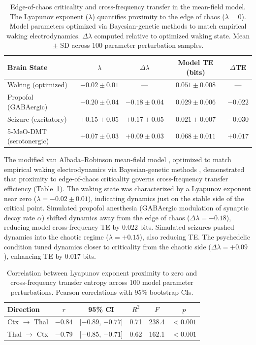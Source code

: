 \documentclass[11pt]{article}
\begin{document}
\begin{table}[H]
\centering
\caption{Edge-of-chaos criticality and cross-frequency transfer in the mean-field model. The Lyapunov exponent ($\lambda$) quantifies proximity to the edge of chaos ($\lambda = 0$). Model parameters optimized via Bayesian-genetic methods to match empirical waking electrodynamics. $\Delta\lambda$ computed relative to optimized waking state. Mean $\pm$ SD across 100 parameter perturbation samples.}
\label{tab:model}
\begin{tabular}{lcccc}
\toprule
Brain State & $\lambda$ & $\Delta\lambda$ & Model TE (bits) & $\Delta$TE \\
\midrule
Waking (optimized) & $-0.02 \pm 0.01$ & --- & $0.051 \pm 0.008$ & --- \\
Propofol (GABAergic) & $-0.20 \pm 0.04$ & $-0.18 \pm 0.04$ & $0.029 \pm 0.006$ & $-0.022$ \\
Seizure (excitatory) & $+0.15 \pm 0.05$ & $+0.17 \pm 0.05$ & $0.021 \pm 0.007$ & $-0.030$ \\
5-MeO-DMT (serotonergic) & $+0.07 \pm 0.03$ & $+0.09 \pm 0.03$ & $0.068 \pm 0.011$ & $+0.017$ \\
\bottomrule
\end{tabular}
\end{table}

The modified van Albada--Robinson mean-field model \citep{vanalbada2009mean}, optimized to match empirical waking electrodynamics via Bayesian-genetic methods \citep{sherif2020bayesian}, demonstrated that proximity to edge-of-chaos criticality governs cross-frequency transfer efficiency (Table~\ref{tab:model}). The waking state was characterized by a Lyapunov exponent near zero ($\lambda = -0.02 \pm 0.01$), indicating dynamics just on the stable side of the critical point. Simulated propofol anesthesia (GABAergic modulation of synaptic decay rate $\alpha$) shifted dynamics away from the edge of chaos ($\Delta\lambda = -0.18$), reducing model cross-frequency TE by 0.022 bits. Simulated seizures pushed dynamics into the chaotic regime ($\lambda = +0.15$), also reducing TE. The psychedelic condition tuned dynamics closer to criticality from the chaotic side ($\Delta\lambda = +0.09$), enhancing TE by 0.017 bits.

\begin{table}[H]
\centering
\caption{Correlation between Lyapunov exponent proximity to zero and cross-frequency transfer entropy across 100 model parameter perturbations. Pearson correlations with 95\% bootstrap CIs.}
\label{tab:correlation}
\begin{tabular}{lccccc}
\toprule
Direction & $r$ & 95\% CI & $R^2$ & $F$ & $p$ \\
\midrule
Ctx $\to$ Thal & $-0.84$ & [$-0.89$, $-0.77$] & 0.71 & 238.4 & $< 0.001$ \\
Thal $\to$ Ctx & $-0.79$ & [$-0.85$, $-0.71$] & 0.62 & 162.1 & $< 0.001$ \\
\bottomrule
\end{tabular}
\end{table}
\end{document}
